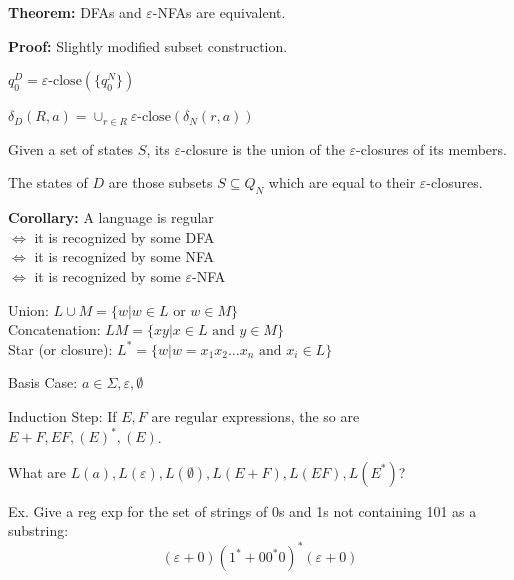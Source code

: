 \begin{frame}

{\bf Theorem:}  DFAs and $\varepsilon$-NFAs are equivalent.

{\bf Proof:}  Slightly modified subset construction.

$q^D_0=\varepsilon\text{-close}(\{q^N_0\})$

$\delta_D(R,a)=\cup_{r\in R}\varepsilon\text{-close}(\delta_N(r,a))$

Given a set of states $S$, its $\varepsilon$-closure is the union of
the $\varepsilon$-closures of its members.  

The states of $D$ are those subsets $S\subseteq Q_N$ which are equal
to their $\varepsilon$-closures. 

{\bf Corollary:}
A language is regular \\
$\iff$ it is recognized by some DFA \\
$\iff$ it is recognized by some NFA \\
$\iff$ it is recognized by some $\varepsilon$-NFA
\end{frame}

\begin{frame}

Union: $L\cup M=\{w|w\in L\text{ or }w\in M\}$ \\
Concatenation: $LM=\{xy|x\in L\text{ and }y\in M\}$ \\
Star (or closure): $L^*=\{w|w=x_1x_2\ldots x_n\text{ and }x_i\in L\}$


Basis Case: $a\in\Sigma,\varepsilon,\emptyset$

Induction Step: If $E,F$ are regular expressions, the so are
$E+F,EF,(E)^*,(E)$.

What are $L(a),L(\varepsilon),L(\emptyset),L(E+F),L(EF),L(E^*)$?

Ex. Give a reg exp for the set of strings of 0s and 1s not
containing 101 as a substring:
$$
(\varepsilon+0)(1^*+00^*0)^*(\varepsilon+0)
$$
\end{frame}

